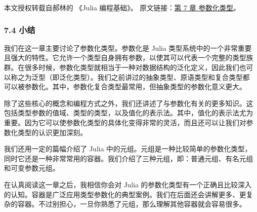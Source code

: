
本文授权转载自郝林的 《Julia 编程基础》。 原文链接：\href{https://github.com/hyper0x/JuliaBasics/blob/master/book/ch07.md}{第 7 章 参数化类型}。


\subsubsection{7.4 小结}

我们在这一章主要讨论了参数化类型。参数化是 Julia 类型系统中的一个非常重要且强大的特性。它允许一个类型自身拥有参数，以使其可以代表一个完整的类型族群。在很多时候，参数化类型就相当于一种对数据结构的泛化定义，因此我们也可以称之为泛型（即泛化类型）。我们之前讲过的抽象类型、原语类型和复合类型都可以被参数化。其中，参数化复合类型最常用，但抽象类型的参数化意义更大。

除了这些核心的概念和编程方式之外，我们还讲述了与参数化有关的更多知识。这包括类型参数的值域、类型的类型，以及值化的表示法。其中，值化的表示法尤为重要。因为它可以使参数化类型的具体化变得非常的灵活，而且还可以让我们对参数化类型的认识更加深刻。

我们还用一定的篇幅介绍了 Julia 中的元组。元组是一种比较简单的参数化类型，同时它还是一种非常常用的容器。我们介绍了三种元组，即：普通元组、有名元组和可变参数元组。

在认真阅读这一章之后，我相信你会对 Julia 的参数化类型有一个正确且比较深入的认知。容器是广泛应用类型参数化的典型案例。我们在后面还会讲解更多、更复杂的容器。不过别担心，一旦你熟悉了元组，那么理解其他容器就会容易很多。
